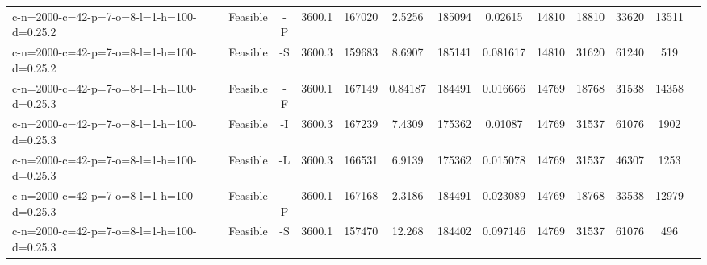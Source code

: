 \documentclass[landscape, a4paper]{article}
\begin{document}
\begin{center}
\begin{tabular}{lcccccccccccc}
c-n=2000-c=42-p=7-o=8-l=1-h=100-d=0.25.2 & Feasible & -P & 3600.1 & 167020 & 2.5256 & 185094 & 0.02615 & 14810 & 18810 & 33620 & 13511 & \\
c-n=2000-c=42-p=7-o=8-l=1-h=100-d=0.25.2 & Feasible & -S & 3600.3 & 159683 & 8.6907 & 185141 & 0.081617 & 14810 & 31620 & 61240 & 519 & \\
c-n=2000-c=42-p=7-o=8-l=1-h=100-d=0.25.3 & Feasible & -F & 3600.1 & 167149 & 0.84187 & 184491 & 0.016666 & 14769 & 18768 & 31538 & 14358 & \\
c-n=2000-c=42-p=7-o=8-l=1-h=100-d=0.25.3 & Feasible & -I & 3600.3 & 167239 & 7.4309 & 175362 & 0.01087 & 14769 & 31537 & 61076 & 1902 & \\
c-n=2000-c=42-p=7-o=8-l=1-h=100-d=0.25.3 & Feasible & -L & 3600.3 & 166531 & 6.9139 & 175362 & 0.015078 & 14769 & 31537 & 46307 & 1253 & \\
c-n=2000-c=42-p=7-o=8-l=1-h=100-d=0.25.3 & Feasible & -P & 3600.1 & 167168 & 2.3186 & 184491 & 0.023089 & 14769 & 18768 & 33538 & 12979 & \\
c-n=2000-c=42-p=7-o=8-l=1-h=100-d=0.25.3 & Feasible & -S & 3600.1 & 157470 & 12.268 & 184402 & 0.097146 & 14769 & 31537 & 61076 & 496 & \\
\end{tabular}
\end{center}
\end{document}

